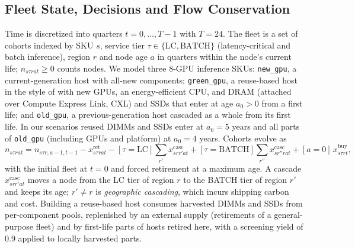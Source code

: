 \documentclass[11pt]{article}
\begin{document}
\subsection{Fleet State, Decisions and Flow Conservation}
Time is discretized into quarters $t=0,\dots,T-1$ with $T=24$. The fleet is a set of cohorts indexed by SKU $s$, service tier $\tau\in\{\text{LC},\text{BATCH}\}$ (latency-critical and batch inference), region $r$ and node age $a$ in quarters within the node's current life; $n_{s\tau rat}\ge 0$ counts nodes. We model three 8-GPU inference SKUs: \texttt{new\_gpu}, a current-generation host with all-new components; \texttt{green\_gpu}, a reuse-based host in the style of \citet{wang2024greensku} with new GPUs, an energy-efficient CPU, and DRAM (attached over Compute Express Link, CXL) and SSDs that enter at age $a_0>0$ from a first life; and \texttt{old\_gpu}, a previous-generation host cascaded as a whole from its first life. In our scenarios reused DIMMs and SSDs enter at $a_0=5$ years and all parts of \texttt{old\_gpu} (including GPUs and platform) at $a_0=4$ years. Cohorts evolve as
\begin{equation}
n_{s\tau rat} = n_{s\tau r,a-1,t-1} - x^{\text{ret}}_{s\tau rat} - [\tau{=}\text{LC}]\sum_{r'} x^{\text{casc}}_{srr'at} + [\tau{=}\text{BATCH}]\sum_{r''} x^{\text{casc}}_{sr''rat} + [a{=}0]\,x^{\text{buy}}_{s\tau rt},
\label{eq:flow}
\end{equation}
with the initial fleet at $t=0$ and forced retirement at a maximum age. A cascade $x^{\text{casc}}_{srr'at}$ moves a node from the LC tier of region $r$ to the BATCH tier of region $r'$ and keeps its age; $r'\neq r$ is \emph{geographic cascading}, which incurs shipping carbon and cost. Building a reuse-based host consumes harvested DIMMs and SSDs from per-component pools, replenished by an external supply (retirements of a general-purpose fleet) and by first-life parts of hosts retired here, with a screening yield of 0.9 applied to locally harvested parts.
\end{document}
